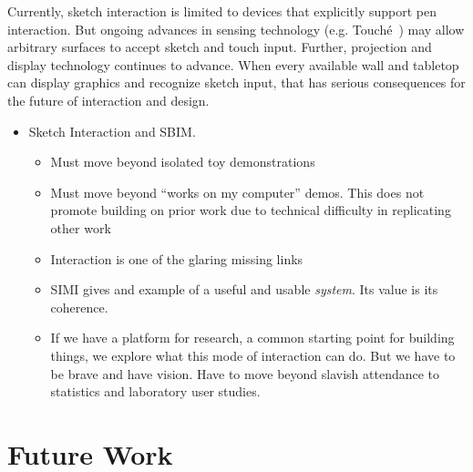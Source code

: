 Currently, sketch interaction is limited to devices that explicitly
support pen interaction. But ongoing advances in sensing technology
(e.g. Touché~\cite{sato-touche}) may allow arbitrary surfaces to
accept sketch and touch input. Further, projection and display
technology continues to advance. When every available wall and
tabletop can display graphics and recognize sketch input, that has
serious consequences for the future of interaction and design.

\begin{itemize}

\item Sketch Interaction and SBIM. 
  \begin{itemize}
  \item Must move beyond isolated toy demonstrations
  \item Must move beyond ``works on my computer'' demos. This does not
    promote building on prior work due to technical difficulty in
    replicating other work
  \item Interaction is one of the glaring missing links
  \item SIMI gives and example of a useful and usable
    \textit{system}. Its value is its coherence.
  \item If we have a platform for research, a common starting point
    for building things, we explore what this mode of interaction can
    do. But we have to be brave and have vision. Have to move beyond
    slavish attendance to statistics and laboratory user studies.
  \end{itemize}
\end{itemize}

\section{Future Work}


